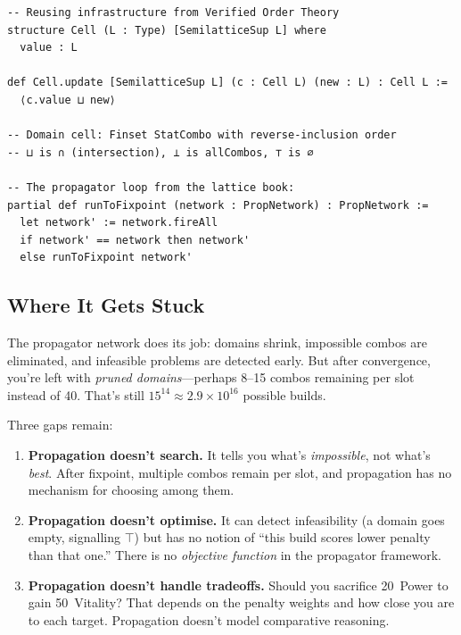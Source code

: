 \documentclass[11pt, a4paper, oneside]{book}
\begin{document}
\begin{leanbox}[title={Lean 4 (Mathlib) --- Propagator Network (from the Lattice Book)}]
\begin{verbatim}
-- Reusing infrastructure from Verified Order Theory
structure Cell (L : Type) [SemilatticeSup L] where
  value : L

def Cell.update [SemilatticeSup L] (c : Cell L) (new : L) : Cell L :=
  ⟨c.value ⊔ new⟩

-- Domain cell: Finset StatCombo with reverse-inclusion order
-- ⊔ is ∩ (intersection), ⊥ is allCombos, ⊤ is ∅

-- The propagator loop from the lattice book:
partial def runToFixpoint (network : PropNetwork) : PropNetwork :=
  let network' := network.fireAll
  if network' == network then network'
  else runToFixpoint network'
\end{verbatim}
\end{leanbox}

\subsection{Where It Gets Stuck}

The propagator network does its job: domains shrink, impossible combos are
eliminated, and infeasible problems are detected early.  But after convergence,
you're left with \emph{pruned domains}---perhaps 8--15 combos remaining per
slot instead of 40.  That's still $15^{14} \approx 2.9 \times 10^{16}$
possible builds.

Three gaps remain:

\begin{enumerate}[nosep]
  \item \textbf{Propagation doesn't search.}  It tells you what's
    \emph{impossible}, not what's \emph{best}.  After fixpoint, multiple combos
    remain per slot, and propagation has no mechanism for choosing among them.

  \item \textbf{Propagation doesn't optimise.}  It can detect infeasibility
    (a domain goes empty, signalling $\top$) but has no notion of ``this build
    scores lower penalty than that one.''  There is no \emph{objective function}
    in the propagator framework.

  \item \textbf{Propagation doesn't handle tradeoffs.}  Should you sacrifice
    20~Power to gain 50~Vitality?  That depends on the penalty weights and
    how close you are to each target.  Propagation doesn't model comparative
    reasoning.
\end{enumerate}
\end{document}
